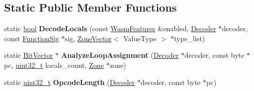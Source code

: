 \subsection*{Static Public Member Functions}
\begin{DoxyCompactItemize}
\item 
\mbox{\label{classv8_1_1internal_1_1wasm_1_1WasmDecoder_a245a4cda6bccd88417c54633ba464a29}} 
static \mbox{\hyperlink{classbool}{bool}} {\bfseries Decode\+Locals} (const \mbox{\hyperlink{structv8_1_1internal_1_1wasm_1_1WasmFeatures}{Wasm\+Features}} \&enabled, \mbox{\hyperlink{classv8_1_1internal_1_1wasm_1_1Decoder}{Decoder}} $\ast$decoder, const \mbox{\hyperlink{classv8_1_1internal_1_1Signature}{Function\+Sig}} $\ast$sig, \mbox{\hyperlink{classv8_1_1internal_1_1ZoneVector}{Zone\+Vector}}$<$ Value\+Type $>$ $\ast$type\+\_\+list)
\item 
\mbox{\label{classv8_1_1internal_1_1wasm_1_1WasmDecoder_a6dde667a8a8cfce46d9c655c127f468a}} 
static \mbox{\hyperlink{classv8_1_1internal_1_1BitVector}{Bit\+Vector}} $\ast$ {\bfseries Analyze\+Loop\+Assignment} (\mbox{\hyperlink{classv8_1_1internal_1_1wasm_1_1Decoder}{Decoder}} $\ast$decoder, const byte $\ast$pc, \mbox{\hyperlink{classuint32__t}{uint32\+\_\+t}} locals\+\_\+count, \mbox{\hyperlink{classv8_1_1internal_1_1Zone}{Zone}} $\ast$zone)
\item 
\mbox{\label{classv8_1_1internal_1_1wasm_1_1WasmDecoder_aac254ccae1147bd956e462ddcd8775c1}} 
static \mbox{\hyperlink{classuint32__t}{uint32\+\_\+t}} {\bfseries Opcode\+Length} (\mbox{\hyperlink{classv8_1_1internal_1_1wasm_1_1Decoder}{Decoder}} $\ast$decoder, const byte $\ast$pc)
\end{DoxyCompactItemize}
